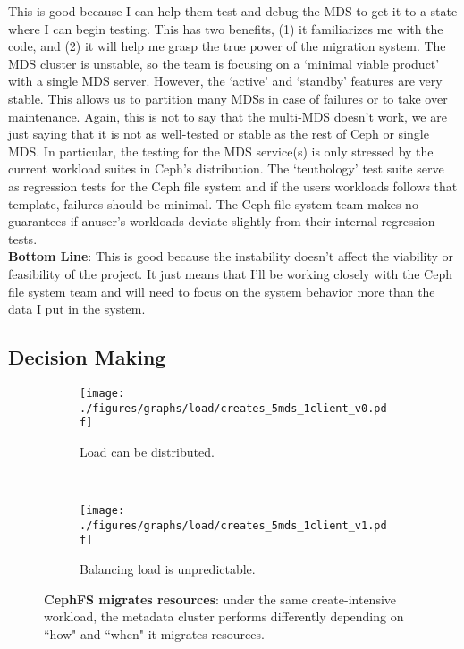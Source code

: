 This is good because I can help them test and debug the MDS to get it to a state where I can begin testing. This has two benefits, (1) it familiarizes me with the code, and (2) it will help me grasp the true power of the migration system. The MDS cluster is unstable, so the team is focusing on a `minimal viable product' with a single MDS server. However, the `active' and `standby' features are very stable. This allows us to partition many MDSs in case of failures or to take over maintenance. Again, this is not to say that the multi-MDS doesn't work, we are just saying that it is not as well-tested or stable as the rest of Ceph or single MDS. In particular, the testing for the MDS service(s) is only stressed by the current workload suites in Ceph's distribution. The `teuthology' test suite serve as regression tests for the Ceph file system and if the users workloads follows that template, failures should be minimal. The Ceph file system team makes no guarantees if anuser's workloads deviate slightly from their internal regression tests. \\

\noindent\textbf{Bottom Line}: This is good because the instability doesn't affect the viability or feasibility of the project. It just means that I'll be working closely with the Ceph file system team and will need to focus on the system behavior more than the data I put in the system. 


\subsection{Decision Making}
\begin{figure*}[tbh]
	\begin{subfigure}[H]{0.5\textwidth}
	\centering
	\texttt{[image: ./figures/graphs/load/creates\_5mds\_1client\_v0.pdf]} 
	\caption{Load can be distributed.\label{creates_5mds_1client_v0}}
	\end{subfigure}
	~
	\begin{subfigure}[H]{0.5\textwidth}
	\centering	
	\texttt{[image: ./figures/graphs/load/creates\_5mds\_1client\_v1.pdf]}
	\caption{Balancing load is unpredictable.\label{creates_5mds_1client_v1}}
	\end{subfigure}	
	\caption{\textbf{CephFS migrates resources}: under the same create-intensive workload, the metadata cluster performs differently depending on ``how" and ``when" it migrates resources. \label{load}}
\end{figure*}

